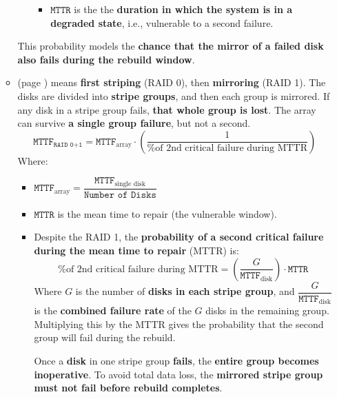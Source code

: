 \begin{itemize}
\begin{itemize}
\begin{itemize}
\begin{itemize}
                \item $\texttt{MTTR}$ is the the \textbf{duration in which the system is in a degraded state}, i.e., vulnerable to a second failure.
            \end{itemize}
        \end{itemize}
        This probability models the \textbf{chance that the mirror of a failed disk also fails during the rebuild window}.


        \item {} (page ) means \textbf{first striping} (RAID 0), then \textbf{mirroring} (RAID 1). The disks are divided into \textbf{stripe groups}, and then each group is mirrored. If any disk in a stripe group fails, \textbf{that whole group is lost}. The array can survive \textbf{a single group failure}, but not a second.
        \begin{equation}
            \texttt{MTTF}_{\texttt{RAID 0+1}} = \texttt{MTTF}_{\text{array}} \cdot \left(
                \dfrac{1}{\text{\% of 2nd critical failure during MTTR}}
            \right)
        \end{equation}
        Where:
        \begin{itemize}
            \item $\texttt{MTTF}_{\text{array}} = \dfrac{\texttt{MTTF}_{\text{single disk}}}{\texttt{Number of Disks}}$
            \item $\texttt{MTTR}$ is the mean time to repair (the vulnerable window).
            \item Despite the RAID 1, the \textbf{probability of a second critical failure during the mean time to repair} (MTTR) is:
            \begin{equation}
                \text{\% of 2nd critical failure during MTTR} = \left(\dfrac{G}{\texttt{MTTF}_{\text{disk}}}\right) \cdot \texttt{MTTR}
            \end{equation}
            Where $G$ is the number of \textbf{disks in each stripe group}, and $\dfrac{G}{\texttt{MTTF}_{\text{disk}}}$ is the \textbf{combined failure rate} of the $G$ disks in the remaining group. Multiplying this by the MTTR gives the probability that the second group will fail during the rebuild.
            
            Once a \textbf{disk} in one stripe group \textbf{fails}, the \textbf{entire group becomes inoperative}. To avoid total data loss, the \textbf{mirrored stripe group must not fail before rebuild completes}. 
        \end{itemize}


\end{itemize}
\end{itemize}
